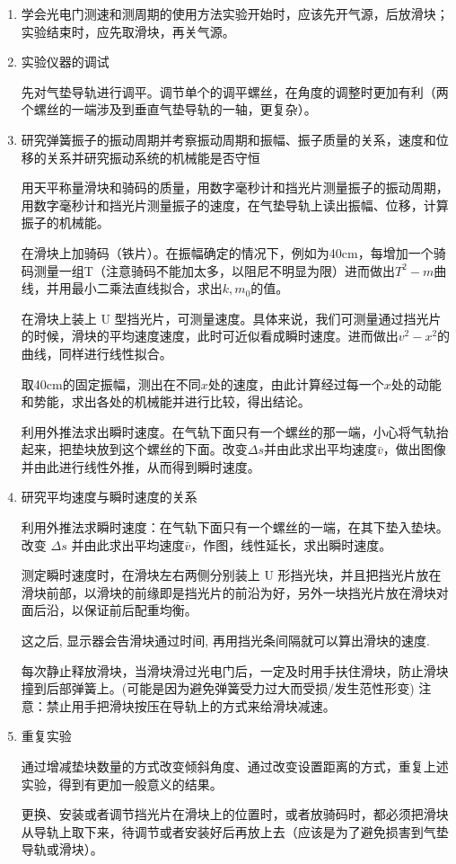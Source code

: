 \documentclass[11pt]{article}
\begin{document}
\begin{enumerate}
    \item 学会光电门测速和测周期的使用方法实验开始时，应该先开气源，后放滑块；实验结束时，应先取滑块，再关气源。
    
    \item 实验仪器的调试
    
    先对气垫导轨进行调平。调节单个的调平螺丝，在角度的调整时更加有利（两个螺丝的一端涉及到垂直气垫导轨的一轴，更复杂）。

    \item 研究弹簧振子的振动周期并考察振动周期和振幅、振子质量的关系，速度和位移的关系并研究振动系统的机械能是否守恒
    
    用天平称量滑块和骑码的质量，用数字毫秒计和挡光片测量振子的振动周期，用数字毫秒计和挡光片测量振子的速度，在气垫导轨上读出振幅、位移，计算振子的机械能。

    在滑块上加骑码（铁片）。在振幅确定的情况下，例如为40cm，每增加一个骑码测量一组T（注意骑码不能加太多，以阻尼不明显为限）进而做出$T^2-m$曲线，并用最小二乘法直线拟合，求出$k,m_0$的值。

    在滑块上装上 U 型挡光片，可测量速度。具体来说，我们可测量通过挡光片的时候，滑块的平均速度速度，此时可近似看成瞬时速度。进而做出$v^2-x^2$的曲线，同样进行线性拟合。

    取40cm的固定振幅，测出在不同$x$处的速度，由此计算经过每一个$x$处的动能和势能，求出各处的机械能并进行比较，得出结论。

    利用外推法求出瞬时速度。在气轨下面只有一个螺丝的那一端，小心将气轨抬起来，把垫块放到这个螺丝的下面。改变$\Delta s$并由此求出平均速度$\bar{v}$，做出图像并由此进行线性外推，从而得到瞬时速度。
    
    \item 研究平均速度与瞬时速度的关系
    
    利用外推法求瞬时速度：在气轨下面只有一个螺丝的一端，在其下垫入垫块。改变 $\Delta s$ 并由此求出平均速度$\bar{v}$，作图，线性延长，求出瞬时速度。
    
    测定瞬时速度时，在滑块左右两侧分别装上 U 形挡光块，并且把挡光片放在滑块前部，以滑块的前缘即是挡光片的前沿为好，另外一块挡光片放在滑块对面后沿，以保证前后配重均衡。
    
    这之后, 显示器会告滑块通过时间, 再用挡光条间隔就可以算出滑块的速度.
    
    每次静止释放滑块，当滑块滑过光电门后，一定及时用手扶住滑块，防止滑块撞到后部弹簧上。(可能是因为避免弹簧受力过大而受损/发生范性形变) 注意：禁止用手把滑块按压在导轨上的方式来给滑块减速。
    
    \item 重复实验
    
    通过增减垫块数量的方式改变倾斜角度、通过改变设置距离的方式，重复上述实验，得到有更加一般意义的结果。
    
    更换、安装或者调节挡光片在滑块上的位置时，或者放骑码时，都必须把滑块从导轨上取下来，待调节或者安装好后再放上去（应该是为了避免损害到气垫导轨或滑块）。

\end{enumerate}
\end{document}
